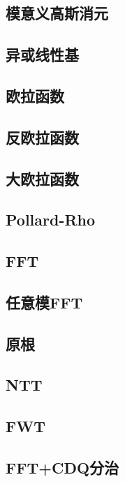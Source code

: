 \documentclass{article}
\begin{document}
\subsection{模意义高斯消元} 

\subsection{异或线性基} 


\subsection{欧拉函数} 

\subsection{反欧拉函数} 

\subsection{大欧拉函数} 

\subsection{Pollard-Rho} 


\subsection{FFT} 

\subsection{任意模FFT} 

\subsection{原根} 

\subsection{NTT} 

\subsection{FWT} 

\subsection{FFT+CDQ分治} 

\end{document}
